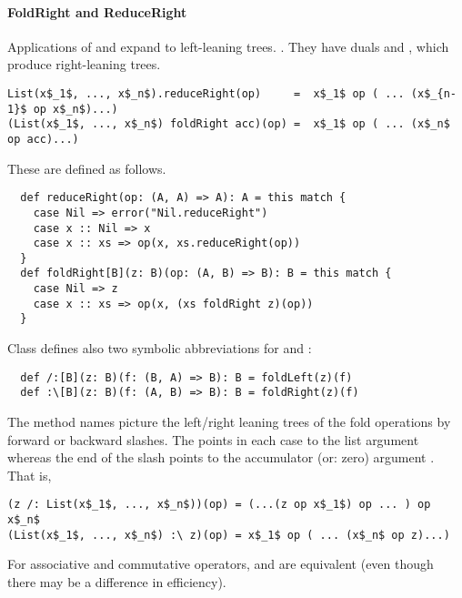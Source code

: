 \paragraph{FoldRight and ReduceRight}
Applications of  and  expand to
left-leaning trees. .  They have duals
 and , which produce right-leaning
trees.
\begin{lstlisting}
List(x$_1$, ..., x$_n$).reduceRight(op)     =  x$_1$ op ( ... (x$_{n-1}$ op x$_n$)...)
(List(x$_1$, ..., x$_n$) foldRight acc)(op) =  x$_1$ op ( ... (x$_n$ op acc)...)
\end{lstlisting}
These are defined as follows.
\begin{lstlisting}
  def reduceRight(op: (A, A) => A): A = this match {
    case Nil => error("Nil.reduceRight")
    case x :: Nil => x
    case x :: xs => op(x, xs.reduceRight(op))
  }
  def foldRight[B](z: B)(op: (A, B) => B): B = this match {
    case Nil => z
    case x :: xs => op(x, (xs foldRight z)(op))
  }
\end{lstlisting}

Class  defines also two symbolic abbreviations for
 and :
\begin{lstlisting}
  def /:[B](z: B)(f: (B, A) => B): B = foldLeft(z)(f)
  def :\[B](z: B)(f: (A, B) => B): B = foldRight(z)(f)
\end{lstlisting}
The method names picture the left/right leaning trees of the fold
operations by forward or backward slashes. The \code{:} points in each
case to the list argument whereas the end of the slash points to the
accumulator (or: zero) argument . 
That is, 
\begin{lstlisting}
(z /: List(x$_1$, ..., x$_n$))(op) = (...(z op x$_1$) op ... ) op x$_n$ 
(List(x$_1$, ..., x$_n$) :\ z)(op) = x$_1$ op ( ... (x$_n$ op z)...)
\end{lstlisting}
For associative and commutative operators, \code{/:} and
\code{:\\} are equivalent (even though there may be a difference
in efficiency).  

